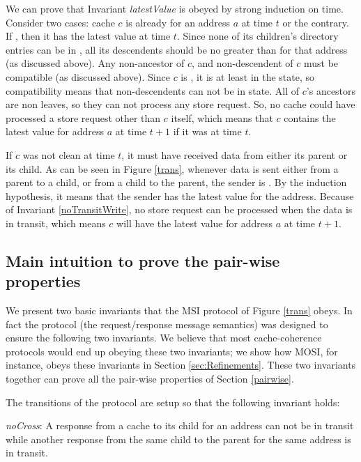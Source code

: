 We can prove that Invariant \textit{latestValue} is obeyed by strong induction
on time. Consider two cases: cache $c$ is already \clean{} for an address $a$
at time $t$ or the contrary.  If \clean{}, then it has the latest value at time
$t$. Since none of its children's directory entries can be in \Mo{}, all its
descendents should be no greater than \Sh{} for that address (as discussed
above). Any non-ancestor of $c$, and non-descendent of $c$ must be compatible
(as discussed above). Since $c$ is \clean, it is at least in the \Sh{} state,
so compatibility means that non-descendents can not be in \Mo{} state. All of
$c$'s ancestors are non leaves, so they can not process any store request. So,
no cache could have processed a store request other than $c$ itself, which
means that $c$ contains the latest value for address $a$ at time $t+1$ if it
was \clean{} at time $t$.

If $c$ was not clean at time $t$, it must have received data from either its
parent or its child.  As can be seen in Figure \ref{trans}, whenever data is
sent either from a parent to a child, or from a child to the parent, the sender
is \clean. By the induction hypothesis, it means that the sender has the latest
value for the address. Because of Invariant \ref{noTransitWrite}, no store
request can be processed when the data is in transit, which means $c$ will have
the latest value for address $a$ at time $t+1$.

\subsection{Main intuition to prove the pair-wise properties}
We present two basic invariants that the MSI protocol of Figure \ref{trans}
obeys. In fact the protocol (\ie the request/response message semantics) was
designed to ensure the following two invariants. We believe that most
cache-coherence protocols would end up obeying these two invariants; we show
how MOSI, for instance, obeys these invariants in Section
\ref{sec:Refinements}. These two invariants together can prove all the pair-wise
properties of Section \ref{pairwise}.

The transitions of the protocol are setup so that the following invariant holds:
\begin{inv}
\textit{noCross}: A response from a cache to its child for an address can not
be in transit while another response from the same child to the parent for the
same address is in transit.
\label{noCross}
\end{inv}

